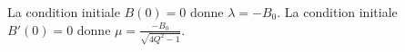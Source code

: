 
\begin{corrige}
La condition initiale $B(0) = 0$ donne $\lambda = -B_0$. La condition initiale $B'(0) = 0$ donne 
$\mu = \frac{-B_0}{\sqrt{4Q^2-1}}$.
\end{corrige}



\finEntrainement




\newpage




